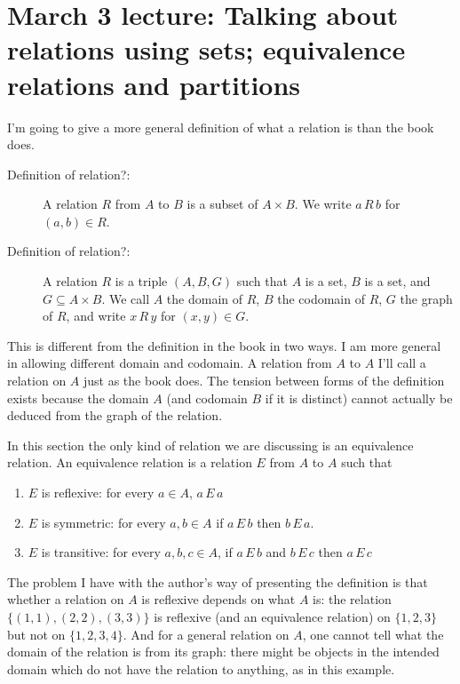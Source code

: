 \documentclass[12pt]{article}
\begin{document}
\newpage

\section{March 3 lecture:  Talking about relations using sets;  equivalence relations and partitions}

I'm going to give a more general definition of what a relation is than the book does.

\begin{description}

\item[Definition of relation?:]  A relation $R$ from $A$ to $B$ is a subset of $A \times B$.  We write $a \, R\, b$ for
$(a,b) \in R$.

\item[Definition of relation?:]  A relation $R$ is a triple $(A,B,G)$ such that $A$ is a set, $B$ is a set, and $G \subseteq A \times B$.  We call $A$ the domain of $R$, $B$ the codomain of $R$, $G$ the graph of $R$, and write $x \, R \, y$ for
$(x,y) \in G$.

\end{description}


This is different from the definition in the book in two ways.  I am more general in allowing different domain and codomain.  A relation from $A$ to $A$ I'll call a relation on $A$ just as the book does.  The tension between forms of the definition exists because the domain $A$ (and codomain $B$ if it is distinct) cannot actually be deduced from the graph of the relation.

In this section the only kind of relation we are discussing is an equivalence relation.  An equivalence relation is a relation $E$ from $A$ to $A$ such that

\begin{enumerate}
\item $E$ is reflexive:  for every $a \in A$, $a \, E \, a$

\item $E$ is symmetric:  for every $a,b \in A$ if $a \, E \, b$ then $b \, E \, a$.

\item $E$ is transitive:  for every $a, b, c \in A$, if $a \, E\, b$ and $b \, E \, c$ then $a \, E \, c$


\end{enumerate}

The problem I have with the author's way of presenting the definition is that whether a relation on $A$ is reflexive depends on what $A$ is:  the relation $\{(1,1),(2,2),(3,3)\}$ is reflexive (and an equivalence relation) on $\{1,2,3\}$
but not on $\{1,2,3,4\}$.  And for a general relation on $A$, one cannot tell what the domain of the relation is from its graph:  there might be objects in the intended domain which do not have the relation to anything, as in this example.
\end{document}

